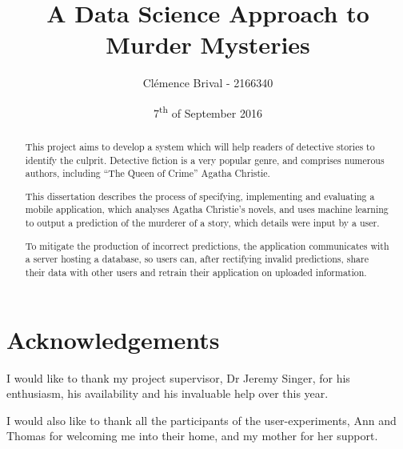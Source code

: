 \documentclass{mproj}
\begin{document}
\title{A Data Science Approach to Murder Mysteries}
\author{Cl\'{e}mence Brival - 2166340}
\date{7\textsuperscript{th} of September 2016}
\maketitle


\begin{abstract}
This project aims to develop a system which will help readers of detective stories to identify the culprit. Detective fiction is a very popular genre, and comprises numerous authors, including ``The Queen of Crime'' Agatha Christie. 

This dissertation describes the process of specifying, implementing and evaluating a mobile application, which analyses Agatha Christie's novels, and uses machine learning to output a prediction of the murderer of a story, which details were input by a user. 

To mitigate the production of incorrect predictions, the application communicates with a server hosting a database, so users can, after rectifying invalid predictions, share their data with other users and retrain their application on uploaded information.
\end{abstract}


\educationalconsent


\newpage
\section*{Acknowledgements}

I would like to thank my project supervisor, Dr Jeremy Singer, for his enthusiasm, his availability and his invaluable help over this year.

I would also like to thank all the participants of the user-experiments, Ann and Thomas for welcoming me into their home, and my mother for her support.
\end{document}
